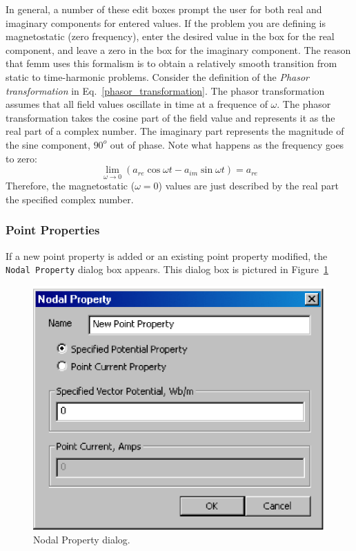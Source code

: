 \documentclass[12pt]{report}
\newcommand{\be}{\begin{equation}}
\newcommand{\ee}{\end{equation}}
\begin{document}
In general, a number of these edit boxes prompt the user for both
real and imaginary components for entered values.  If the problem
you are defining is magnetostatic (zero frequency), enter the
desired value in the box for the real component, and leave a zero
in the box for the imaginary component. The reason that femm uses
this formalism is to obtain a relatively smooth transition from
static to time-harmonic problems.  Consider the definition of the
{\em Phasor transformation} in Eq.~\ref{phasor_transformation}. The
phasor transformation assumes that all field values oscillate in
time at a frequence of $\omega$. The phasor transformation takes
the cosine part of the field value and represents it as the real
part of a complex number.  The imaginary part represents the
magnitude of the sine component, $90^o$ out of phase.  Note what
happens as the frequency goes to zero:
\be \lim_{\omega \rightarrow 0} \left( a_{re} \cos \omega t - a_{im} \sin
\omega t \right) = a_{re} \ee
Therefore, the magnetostatic ($\omega=0$) values are just described
by the real part the specified complex number.

\subsubsection{Point Properties}

If a new point property is added or an existing point property
modified, the {\tt Nodal Property} dialog box appears.  This dialog
box is pictured in Figure~\ref{nodalprop}
\begin{figure}[ht]
\centerline{\includegraphics{nodeprop.ps}}
\caption{Nodal Property dialog.}
\label{nodalprop}
\end{figure}
\end{document}

